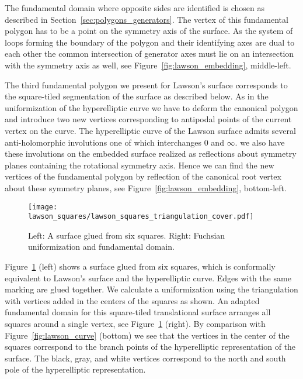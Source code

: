 \documentclass[Thesis]{subfiles}
\begin{document}
The fundamental domain where opposite sides are identified is chosen
as described in Section~\ref{sec:polygons_generators}. 
The vertex of this fundamental polygon has to
be a point on the symmetry axis of the surface. 
As the system of loops forming the boundary of the polygon
and their identifying axes are dual to each other the common
intersection of generator axes must lie on an intersection with the
symmetry axis as well, see Figure~\ref{fig:lawson_embedding},
middle-left.

 The third fundamental polygon we present for Lawson's surface corresponds to the square-tiled segmentation of the surface as described below. As in the uniformization of the hyperelliptic curve we have to deform the canonical polygon and introduce two new vertices corresponding to antipodal points of the current vertex on the curve. The hyperelliptic curve of the Lawson surface admits several anti-holomorphic involutions one of which interchanges $0$ and $\infty$. we also have these involutions on the embedded surface realized as reflections about symmetry planes containing the rotational symmetry axis. Hence we can find the new vertices of the fundamental polygon by reflection of the canonical root vertex about these symmetry planes, see Figure~\ref{fig:lawson_embedding}, bottom-left.


\begin{figure}
	\centering
	\resizebox{\textwidth}{!} {
	\texttt{[image: lawson\_squares/lawson\_squares\_triangulation\_cover.pdf]}
	}
	\caption{Left: A surface glued from six squares. Right:
          Fuchsian uniformization and fundamental domain.}
\label{fig:lawson_squares}
\end{figure}

Figure~\ref{fig:lawson_squares} (left) shows a surface glued from six
squares, which is conformally equivalent to Lawson's surface and the
hyperelliptic curve. Edges with the same marking are glued
together. We calculate a uniformization using the triangulation with
vertices added in the centers of the squares as shown. An adapted
fundamental domain for this square-tiled translational surface
arranges all squares around a single vertex, see
Figure~\ref{fig:lawson_squares} (right). By comparison with
Figure~\ref{fig:lawson_curve} (bottom) we see that the vertices in the
center of the squares correspond to the branch points of the
hyperelliptic representation of the surface. The black, gray, and
white vertices correspond to the north and south pole of the
hyperelliptic representation.

\subfilebibliography
\end{document}
